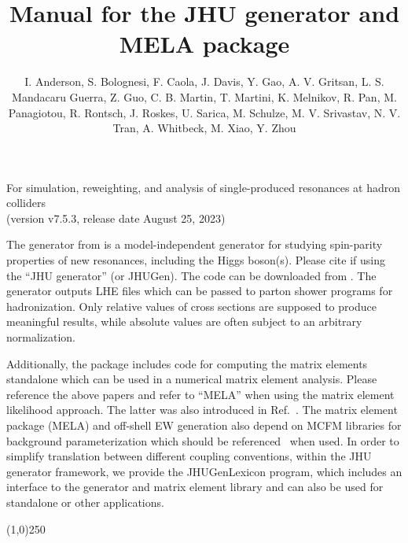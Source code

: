 \documentclass[aps,superscriptaddress,nofootinbib]{revtex4}
\begin{document}
\vspace{0.6cm}

\title{
\large
Manual for the JHU generator and MELA package
}
\author{I. Anderson, S. Bolognesi, F. Caola, J. Davis, Y. Gao, A. V. Gritsan, L. S. Mandacaru Guerra, Z. Guo, C. B. Martin, T. Martini, K. Melnikov, 
R. Pan, M. Panagiotou, R. Rontsch, J. Roskes, U. Sarica, M. Schulze, M. V. Srivastav, N. V. Tran, A. Whitbeck, M. Xiao, Y. Zhou}
\maketitle
\begin{center}
\small
For simulation, reweighting, and analysis of single-produced resonances at hadron colliders \\
(version v7.5.3, release date August 25, 2023) \\
\normalsize
\end{center}


\noindent
The generator from \cite{Gao:2010qx,Bolognesi:2012,Anderson:2013,Gritsan:2016hjl,Gritsan:2020pib,Martini:2021uey,Davis:2022} 
is a model-independent generator for studying spin-parity properties of new resonances, including the Higgs boson(s). 
Please cite \cite{Gao:2010qx,Bolognesi:2012,Anderson:2013,Gritsan:2016hjl,Gritsan:2020pib,Martini:2021uey,Davis:2022} 
if using the ``JHU generator'' (or JHUGen). The code can be downloaded from \cite{thesite}.
The generator outputs LHE files which can be passed to parton shower programs for hadronization.
Only relative values of cross sections are supposed to produce meaningful results, 
while absolute values are often subject to an arbitrary normalization.

Additionally, the package includes code for computing the matrix elements standalone which can be used in a numerical matrix element analysis.
Please reference the above papers and refer to ``MELA'' when using the matrix element likelihood approach.
The latter was also introduced in Ref.~\cite{Chatrchyan:2012ufa}. The matrix element package (MELA) and off-shell EW generation 
also depend on MCFM libraries for background parameterization which should be referenced~\cite{Campbell:2010ff} when used.
In order to simplify translation between different coupling conventions, within the JHU generator framework, we provide the JHUGenLexicon program,
which includes an interface to the generator and matrix element library and can also be used for standalone or other applications. 


\vspace{0.5cm}
\begin{center}
\line(1,0){250}
\end{center}
\vspace{0.5cm}
\tableofcontents
\begin{center}
\end{center}
\vspace{0.5cm}
\end{document}
